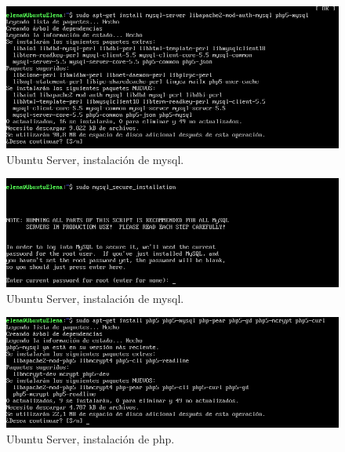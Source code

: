 \begin{figure}[H] 
	\centering
	\includegraphics[width=15cm]{./img/ejercicio9d.png} 	
	\caption{Ubuntu Server, instalación de mysql.} \label{fig:ejercicio9d}
\end{figure}


\begin{figure}[H] 
	\centering
	\includegraphics[width=15cm]{./img/ejercicio9f.png} 	
	\caption{Ubuntu Server, instalación de mysql.} \label{fig:ejercicio9f}
\end{figure}


\begin{figure}[H] 
	\centering
	\includegraphics[width=15cm]{./img/ejercicio9g.png} 	
	\caption{Ubuntu Server, instalación de php.} \label{fig:ejercicio9g}
\end{figure}

